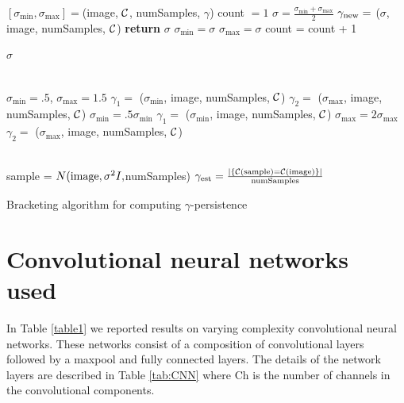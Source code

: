 \begin{algorithm} [h!]
\begin{algorithmic}

\State $[\sigma_{\min},\sigma_{\max}] = $(image, $\mathcal{C}$, numSamples, $\gamma$)
\State count $=1$
\State $\sigma = \frac{\sigma_{\min}+\sigma_{\max}}{2}$
\State $\gamma_{\textnormal{new}} =$ ($\sigma$, image, numSamples, $\mathcal{C}$)
\State \textbf{return} $\sigma$ %
\State $\sigma_{\min} = \sigma$
\Else
\State $\sigma_{\max} = \sigma$
\EndIf
\State count = count + 1
\EndWhile

\Return $\sigma$
\EndFunction

\\
\State $\sigma_{\min}=.5$,\;\; $\sigma_{\max}=1.5$
\State $\gamma_1 =$ ($\sigma_{\min}$, image, numSamples, $\mathcal{C}$)
\State $\gamma_2 =$ ($\sigma_{\max}$, image, numSamples, $\mathcal{C}$)
\State $\sigma_{\min} = .5\sigma_{\min}$
\State $\gamma_1 =$ ($\sigma_{\min}$, image, numSamples, $\mathcal{C}$)
\EndIf
{}
\State $\sigma_{\max} = 2\sigma_{\max}$
\State $\gamma_2 =$ ($\sigma_{\max}$, image, numSamples, $\mathcal{C}$)
\EndIf
\EndWhile

\Return{$[\sigma_{\min}, \sigma_{\max}]$}
\EndFunction

\\
\State sample = $N(\textnormal{image},\sigma^2I,$numSamples)
\State $\gamma_{\textnormal{est}} = \frac{|\{\mathcal{C}(\textnormal{sample})=\mathcal{C}(\textnormal{image})\}|}{\textnormal{numSamples}}$

\EndFunction
\end{algorithmic}
\caption{Bracketing algorithm for computing $\gamma$-persistence}\label{bracketing}
\end{algorithm}


\section{Convolutional neural networks used} \label{appendix:CNNs}
In Table \ref{table1} we reported results on varying complexity convolutional neural networks. These networks consist of a composition of convolutional layers followed by a maxpool and fully connected layers. 
The details of the network layers are described in Table \ref{tab:CNN} where Ch is the number of channels in the convolutional components. %

